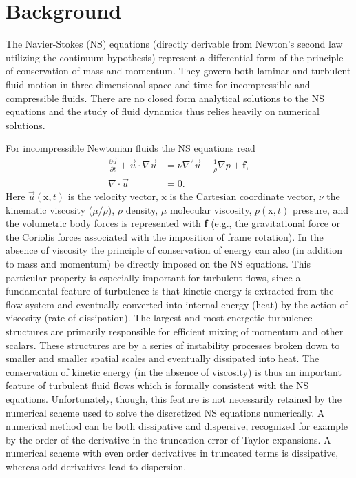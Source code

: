 \section{Background}

The Navier-Stokes (NS) equations (directly derivable from Newton's second law utilizing the continuum hypothesis) represent a differential form of the principle of conservation of mass and momentum. They govern both laminar and turbulent fluid motion in three-dimensional space and time for incompressible and compressible fluids. There are no closed form analytical solutions to the NS equations and the study of fluid dynamics thus relies heavily on numerical solutions.

For incompressible Newtonian fluids the NS equations read
\begin{align}
 \frac{\partial \vec{u}}{\partial t}+\vec{u}\cdot \nabla \vec{u} &= \nu \nabla^2 \vec{u} -\frac{1}{\rho} \nabla p +\mathbf{f}, \label{eq:NS}\\
 \nabla \cdot \vec{u} &=0.
 \label{eq:cont}
\end{align}
Here $\vec{u}(\text{x},t)$ is the velocity vector, $\text{x}$ is the Cartesian coordinate vector, $\nu$ the kinematic
viscosity ($\mu/\rho$), $\rho$ density, $\mu$ molecular viscosity, $p(\text{x},t)$ pressure, and the volumetric body forces is represented with \textbf{f} (e.g., the gravitational force or the Coriolis forces associated with the imposition of frame rotation). In the absence of viscosity the principle of conservation of energy can also (in addition to mass and momentum) be directly imposed on the NS equations. This particular property is especially important for turbulent flows, since a fundamental feature of turbulence is that kinetic energy is extracted from the flow system and eventually converted into internal energy (heat) by the action of viscosity (rate of dissipation). The largest and most energetic turbulence structures are primarily responsible for efficient mixing of momentum and other scalars. These structures are by a series of instability processes broken down to smaller and smaller spatial scales and eventually dissipated into heat. The conservation of kinetic energy (in the absence of viscosity) is thus an important feature of turbulent fluid flows which is formally consistent with the NS equations. Unfortunately, though, this feature is not necessarily retained by the numerical scheme used to solve the discretized NS equations numerically. A numerical method can be both dissipative and dispersive, recognized for example by the order of the derivative in the truncation error of Taylor expansions. A numerical scheme with even order derivatives in truncated terms is dissipative, whereas odd derivatives lead to dispersion.
